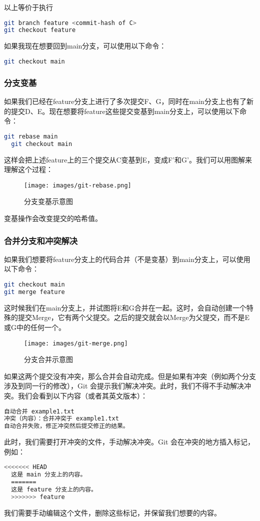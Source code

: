 \documentclass[../main.tex]{subfiles}
\begin{document}
以上等价于执行
\begin{lstlisting}[language=bash]
git branch feature <commit-hash of C>
git checkout feature
\end{lstlisting}

如果我现在想要回到main分支，可以使用以下命令：
\begin{lstlisting}[language=bash]
git checkout main
\end{lstlisting}

\subsubsection{分支变基}

如果我们已经在feature分支上进行了多次提交F、G，同时在main分支上也有了新的提交D、E。现在想要将feature这些提交变基到main分支上，可以使用以下命令：
\begin{lstlisting}[language=bash]
  git rebase main
  git checkout main
\end{lstlisting}
这样会把上述feature上的三个提交从C变基到E，变成F'和G'。我们可以用图解来理解这个过程：

\begin{figure}[ht]
  \centering
  \texttt{[image: images/git-rebase.png]}
  \caption{分支变基示意图}
  \label{fig:git-rebase}
\end{figure}

变基操作会改变提交的哈希值。

\subsubsection{合并分支和冲突解决}

如果我们想要将feature分支上的代码合并（不是变基）到main分支上，可以使用以下命令：

\begin{lstlisting}[language=bash]
git checkout main
git merge feature
\end{lstlisting}

这时候我们在main分支上，并试图将E和G合并在一起。这时，会自动创建一个特殊的提交Merge，它有两个父提交。之后的提交就会以Merge为父提交，而不是E或G中的任何一个。

\begin{figure}[ht]
  \centering
  \texttt{[image: images/git-merge.png]}
  \caption{分支合并示意图}
  \label{fig:git-merge}
\end{figure}

如果这两个提交没有冲突，那么合并会自动完成。但是如果有冲突（例如两个分支涉及到同一行的修改），Git 会提示我们解决冲突。此时，我们不得不手动解决冲突。我们会看到以下内容（或者其英文版本）：
\begin{lstlisting}[language=bash]
  自动合并 example1.txt
冲突（内容）：合并冲突于 example1.txt
自动合并失败，修正冲突然后提交修正的结果。
\end{lstlisting}
此时，我们需要打开冲突的文件，手动解决冲突。Git 会在冲突的地方插入标记，例如：
\begin{lstlisting}[language=bash]
  <<<<<<< HEAD
  这是 main 分支上的内容。
  =======
  这是 feature 分支上的内容。
  >>>>>>> feature
\end{lstlisting}
我们需要手动编辑这个文件，删除这些标记，并保留我们想要的内容。
\end{document}
